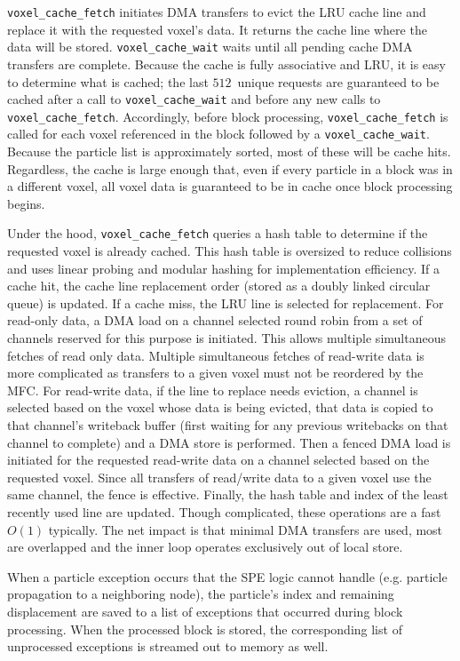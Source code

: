 \documentclass[journal,twoside]{IEEEtran}
\begin{document}
\verb+voxel_cache_fetch+ initiates DMA transfers to evict the LRU
cache line and replace it with the requested voxel's data.  It returns
the cache line where the data will be stored.  \verb+voxel_cache_wait+
waits until all pending cache DMA transfers are complete.  Because the
cache is fully associative and LRU, it is easy to determine what is
cached; the last $512$~unique requests are guaranteed to be cached
after a call to \verb+voxel_cache_wait+ and before any new calls to
\verb+voxel_cache_fetch+.  Accordingly, before block processing,
\verb+voxel_cache_fetch+ is called for each voxel referenced in the
block followed by a \verb+voxel_cache_wait+.  Because the particle
list is approximately sorted, most of these will be cache hits.
Regardless, the cache is large enough that, even if every particle in
a block was in a different voxel, all voxel data is guaranteed to be
in cache once block processing begins.

Under the hood, \verb+voxel_cache_fetch+ queries a hash table to
determine if the requested voxel is already cached.  This hash table
is oversized to reduce collisions and uses linear probing and modular
hashing for implementation efficiency.  If a cache hit, the cache line
replacement order (stored as a doubly linked circular queue) is
updated.  If a cache miss, the LRU line is selected for replacement.
For read-only data, a DMA load on a channel selected round robin from
a set of channels reserved for this purpose is initiated.  This allows
multiple simultaneous fetches of read only data.  Multiple
simultaneous fetches of read-write data is more complicated as
transfers to a given voxel must not be reordered by the MFC.  For
read-write data, if the line to replace needs eviction, a channel is
selected based on the voxel whose data is being evicted, that data is
copied to that channel's writeback buffer (first waiting for any
previous writebacks on that channel to complete) and a DMA store is
performed.  Then a fenced DMA load is initiated for the requested
read-write data on a channel selected based on the requested voxel.
Since all transfers of read/write data to a given voxel use the same
channel, the fence is effective.  Finally, the hash table and index of
the least recently used line are updated.  Though complicated, these
operations are a fast $O(1)$ typically.  The net impact is that
minimal DMA transfers are used, most are overlapped and the inner loop
operates exclusively out of local store.

When a particle exception occurs that the SPE logic cannot handle
(e.g. particle propagation to a neighboring node), the particle's
index and remaining displacement are saved to a list of exceptions
that occurred during block processing.  When the processed block is
stored, the corresponding list of unprocessed exceptions is streamed
out to memory as well.
\end{document}
